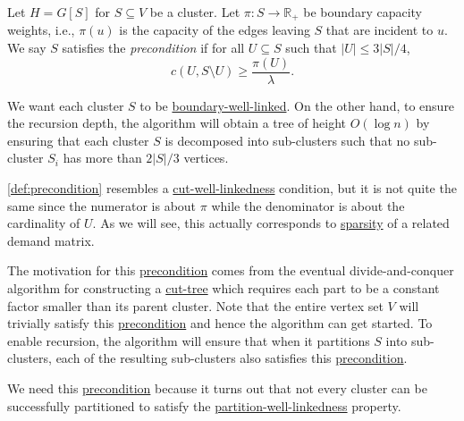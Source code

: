 \begin{definition}[Precondition]\label{def:precondition}
	Let \(H= G[S]\) for \(S \subseteq V\) be a cluster. Let \(\pi \colon S \to \mathbb{R} _+\) be boundary capacity weights, i.e., \(\pi (u)\) is the capacity of the edges leaving \(S\) that are incident to \(u\). We say \(S\) satisfies the \emph{precondition} if for all \(U \subseteq S\) such that \(\lvert U \rvert \leq 3 \lvert S \rvert / 4\),
	\[
		c(U, S \setminus U)
		\geq \frac{\pi (U)}{\lambda }.
	\]
\end{definition}

\begin{intuition}
	We want each cluster \(S\) to be \hyperref[def:boundary-well-linked]{boundary-well-linked}. On the other hand, to ensure the recursion depth, the algorithm will obtain a tree of height \(O(\log n)\) by ensuring that each cluster \(S\) is decomposed into sub-clusters such that no sub-cluster \(S_i\) has more than \(2 \lvert S \rvert / 3\) vertices.
\end{intuition}

\autoref{def:precondition} resembles a \hyperref[def:cut-well-linked]{cut-well-linkedness} condition, but it is not quite the same since the numerator is about \(\pi \) while the denominator is about the cardinality of \(U\). As we will see, this actually corresponds to \hyperref[def:sparsity]{sparsity} of a related demand matrix.

The motivation for this \hyperref[def:precondition]{precondition} comes from the eventual divide-and-conquer algorithm for constructing a \hyperref[def:cut-tree]{cut-tree} which requires each part to be a constant factor smaller than its parent cluster. Note that the entire vertex set \(V\) will trivially satisfy this \hyperref[def:precondition]{precondition} and hence the algorithm can get started. To enable recursion, the algorithm will ensure that when it partitions \(S\) into sub-clusters, each of the resulting sub-clusters also satisfies this \hyperref[def:precondition]{precondition}.

\begin{intuition}
	We need this \hyperref[def:precondition]{precondition} because it turns out that not every cluster can be successfully partitioned to satisfy the \hyperref[def:partition-and-boundary-well-linked]{partition-well-linkedness} property.
\end{intuition}

